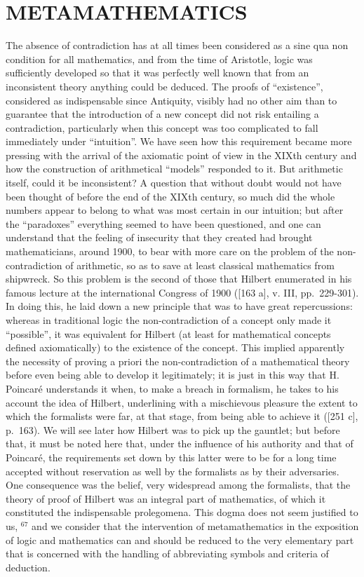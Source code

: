 \section*{METAMATHEMATICS}
{}

The absence of contradiction has at all times been considered as a sine qua non condition for all mathematics, and from the time of Aristotle, logic was sufficiently developed so that it was perfectly well known that from an inconsistent theory anything could be deduced. The proofs of ``existence'', considered as indispensable since Antiquity, visibly had no other aim than to guarantee that the introduction of a new concept did not risk entailing a contradiction, particularly when this concept was too complicated to fall immediately under ``intuition''. We have seen how this requirement became more pressing with the arrival of the axiomatic point of view in the XIXth century and how the construction of arithmetical ``models'' responded to it. But arithmetic itself, could it be inconsistent? A question that without doubt would not have been thought of before the end of the XIXth century, so much did the whole numbers appear to belong to what was most certain in our intuition; but after the ``paradoxes'' everything seemed to have been questioned, and one can understand that the feeling of insecurity that they created had brought mathematicians, around 1900, to bear with more care on the problem of the non-contradiction of arithmetic, so as to save at least classical mathematics from shipwreck. So this problem is the second of those that Hilbert enumerated in his famous lecture at the international Congress of 1900 ({[}163 a{]}, v. III, pp.~229-301). In doing this, he laid down a new principle that was to have great repercussions: whereas in traditional logic the non-contradiction of a concept only made it ``possible'', it was equivalent for Hilbert (at least for mathematical concepts defined axiomatically) to the existence of the concept. This implied apparently the necessity of proving a priori the non-contradiction of a mathematical theory before even being able to develop it legitimately; it is just in this way that H. Poincaré understands it when, to make a breach in formalism, he takes to his account the idea of Hilbert, underlining with a mischievous pleasure the extent to which the formalists were far, at that stage, from being able to achieve it ({[}251 c{]}, p.~163). We will see later how Hilbert was to pick up the gauntlet; but before that, it must be noted here that, under the influence of his authority and that of Poincaré, the requirements set down by this latter were to be for a long time accepted without reservation as well by the formalists as by their adversaries. One consequence was the belief, very widespread among the formalists, that the theory of proof of Hilbert was an integral part of mathematics, of which it constituted the indispensable prolegomena. This dogma does not seem justified to us, \(^{67}\) and we consider that the intervention of metamathematics in the exposition of logic and mathematics can and should be reduced to the very elementary part that is concerned with the handling of abbreviating symbols and criteria of deduction. 
